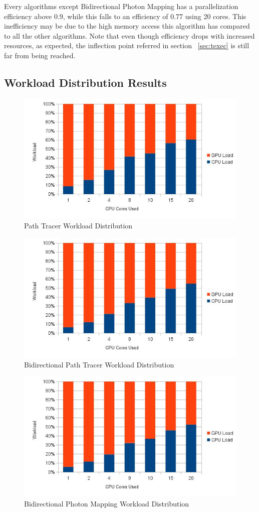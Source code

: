 Every algorithms except Bidirectional Photon Mapping has a parallelization efficiency above 0.9, while this falls to an efficiency of 0.77 using 20 cores. This inefficiency may be due to the high memory access this algorithm has compared to all the other algorithms. Note that even though efficiency drops with increased resources, as expected, the inflection point referred in section ~\ref{sec:texec} is still far from being reached.

\subsection{Workload Distribution Results}

\begin{figure}[H]
\centering
\includegraphics[width=0.8\linewidth]{img/ptwl.jpg}
\caption{\label{img:ptwl} Path Tracer Workload Distribution}
\end{figure}

\begin{figure}[H]
\centering
\includegraphics[width=0.8\linewidth]{img/bptwl.jpg}
\caption{\label{img:bptwl} Bidirectional Path Tracer Workload Distribution}
\end{figure}

\begin{figure}[H]
\centering
\includegraphics[width=0.8\linewidth]{img/bpmwl.jpg}
\caption{\label{img:bpmwl} Bidirectional Photon Mapping Workload Distribution}
\end{figure}

